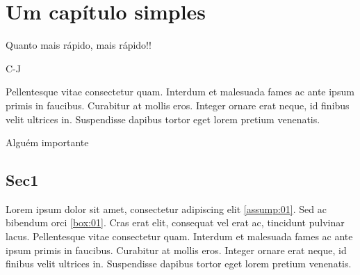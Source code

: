 \documentclass[./main.tex]{subfiles}
\begin{document}
\chapter{Um capítulo simples} \label{chap:2}

\epigraph{Quanto mais rápido, mais rápido!!}{C-J}

\epigraph{Pellentesque vitae consectetur quam. Interdum et malesuada fames ac ante ipsum primis in faucibus. Curabitur at mollis eros. Integer ornare erat neque, id finibus velit ultrices in. Suspendisse dapibus tortor eget lorem pretium venenatis.}{Alguém importante}

\section{Sec1} \label{chp2:sec1}

\par Lorem ipsum dolor sit amet, consectetur adipiscing elit \ref{assump:01}. Sed ac bibendum orci \ref{box:01}. Cras erat elit, consequat vel erat ac, tincidunt pulvinar lacus. Pellentesque vitae consectetur quam. Interdum et malesuada fames ac ante ipsum primis in faucibus. Curabitur at mollis eros. Integer ornare erat neque, id finibus velit ultrices in. Suspendisse dapibus tortor eget lorem pretium venenatis.
\end{document}
